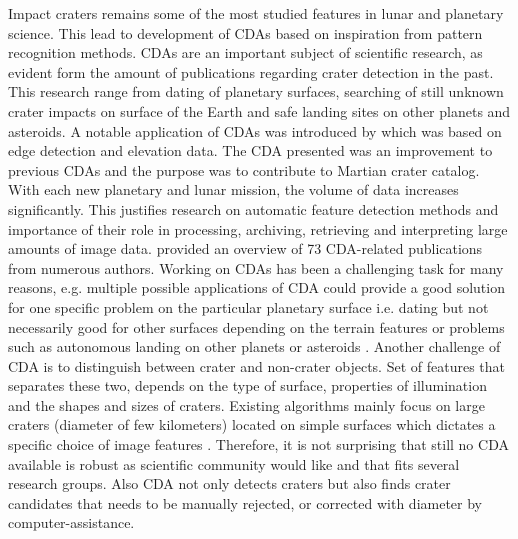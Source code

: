 \documentclass[11pt]{article}
\begin{document}

Impact craters remains some of the most studied features in lunar and planetary science. This lead to development of CDAs based on inspiration from pattern recognition methods. CDAs are an important subject of scientific research, as evident form the amount of publications regarding crater detection in the past. This research range from dating of planetary surfaces, searching of still unknown crater impacts on surface of the Earth and safe landing sites on other planets and asteroids. A notable application of CDAs was introduced by \cite{salamuniccar2010method} which was based on edge detection and elevation data. The CDA presented was an improvement to previous CDAs and the purpose was to contribute to Martian crater catalog. With each new planetary and lunar mission, the volume of data increases significantly. This justifies research on automatic feature detection methods and importance of their role in processing, archiving, retrieving and interpreting large amounts of image data. \cite{salamuniccar2010method} provided an overview of 73 CDA-related publications from numerous authors. Working on CDAs has been a challenging task for many reasons, e.g. multiple possible applications of CDA could provide a good solution for one specific problem on the particular planetary surface i.e. dating \cite{sawabe_2006} but not necessarily good for other surfaces depending on the terrain features or problems such as autonomous landing on other planets or asteroids \cite{leroy2001crater}. Another challenge of CDA is to distinguish between crater and non-crater objects. Set of features that separates these two, depends on the type of surface, properties of illumination and the shapes and sizes of craters. Existing algorithms mainly focus on large craters (diameter of few kilometers) located on simple surfaces which dictates a specific choice of image features \cite{bandeira2010automatic}. Therefore, it is not surprising that still no CDA available is robust as scientific community would like and that fits several research groups. Also CDA not only detects craters but also finds crater candidates that needs to be manually rejected, or corrected with diameter by computer-assistance. 
\end{document}
